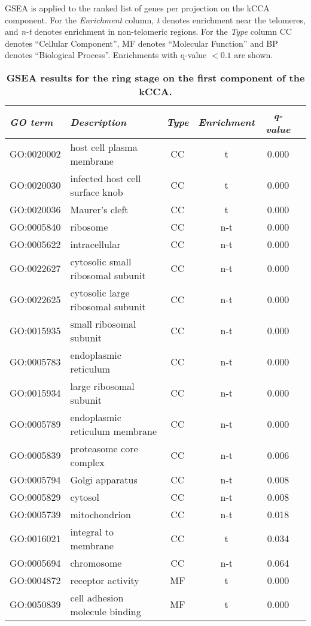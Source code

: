 \documentclass{article}
\begin{document}
\begin{table}
\caption{{\bf GSEA results for the ring stage on the first component of the
kCCA.}}
{\normalsize GSEA is applied to the ranked list of genes per projection on the kCCA
component. For the \emph{Enrichment} column, \emph{t} denotes enrichment near the
telomeres, and \emph{n-t} denotes enrichment in non-telomeric regions.
For the \emph{Type} column CC denotes ``Cellular Component'',
MF denotes ``Molecular Function'' and BP denotes ``Biological Process''.
Enrichments with q-value $< 0.1$ are shown. }
\vspace{10pt}
\begin{center}
\begin{tabular}{llcccc}
\hline
\emph{GO term }&  \emph{Description} & \emph{Type} & \emph{Enrichment} & \emph{q-value}  \\
\hline
GO:0020002 & host cell plasma membrane & CC & t & 0.000\\
GO:0020030 & infected host cell surface knob & CC & t & 0.000\\
GO:0020036 & Maurer's cleft & CC & t & 0.000\\
GO:0005840 & ribosome & CC & n-t & 0.000\\
GO:0005622 & intracellular & CC & n-t & 0.000\\
GO:0022627 & cytosolic small ribosomal subunit & CC & n-t & 0.000\\
GO:0022625 & cytosolic large ribosomal subunit & CC & n-t & 0.000\\
GO:0015935 & small ribosomal subunit & CC & n-t & 0.000\\
GO:0005783 & endoplasmic reticulum & CC & n-t & 0.000\\
GO:0015934 & large ribosomal subunit & CC & n-t & 0.000\\
GO:0005789 & endoplasmic reticulum membrane & CC & n-t & 0.000\\
GO:0005839 & proteasome core complex & CC & n-t & 0.006\\
GO:0005794 & Golgi apparatus & CC & n-t & 0.008\\
GO:0005829 & cytosol & CC & n-t & 0.008\\
GO:0005739 & mitochondrion & CC & n-t & 0.018\\
GO:0016021 & integral to membrane & CC & t & 0.034\\
GO:0005694 & chromosome & CC & n-t & 0.064\\
GO:0004872 & receptor activity & MF & t & 0.000\\
GO:0050839 & cell adhesion molecule binding & MF & t & 0.000\\

\end{tabular}
\end{center}
\end{table}
\end{document}
